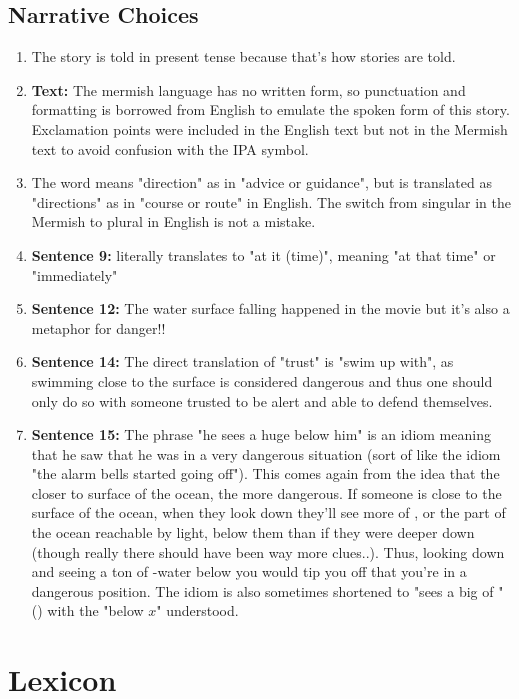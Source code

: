 \documentclass[11pt]{report}
\newcommand{\R}{{\*r}}
\begin{document}
\section{Narrative Choices}
\begin{enumerate}
	\item The story is told in present tense because that's how stories are told.
	\item \textbf{Text:}  The mermish language has no written form, so punctuation and formatting is borrowed from English to emulate the spoken form of this story.  Exclamation points were included in the English text but not in the Mermish text to avoid confusion with the IPA symbol.
	\item The word \textit{} means "direction" as in "advice or guidance", but is translated as "directions" as in "course or route" in English.  The switch from singular in the Mermish to plural in English is not a mistake.
	\item \textbf{Sentence 9:} \textit{} literally translates to "at it (time)", meaning "at that time" or "immediately"
	\item \textbf{Sentence 12:} The water surface falling happened in the movie but it's also a metaphor for danger!!
	\item \textbf{Sentence 14:} The direct translation of "trust" is "swim up with", as swimming close to the surface is considered dangerous and thus one should only do so with someone trusted to be alert and able to defend themselves. 
	\item \textbf{Sentence 15:} The phrase "he sees a huge  below him" is an idiom meaning that he saw that he was in a very dangerous situation (sort of like the idiom "the alarm bells started going off").  This comes again from the idea that the closer to surface of the ocean, the more dangerous.  If someone is close to the surface of the ocean, when they look down they'll see more of , or the part of the ocean reachable by light, below them than if they were deeper down (though really there should have been way more clues..).  Thus, looking down and seeing a ton of -water below you would tip you off that you're in a dangerous position.  The idiom is also sometimes shortened to "sees a big of " (\textit{\textipa{zEm nax\R{}A h2\R{}a}}) with the "below $x$" understood.
\end{enumerate}

\appendix

\chapter{Lexicon}

\end{document}
